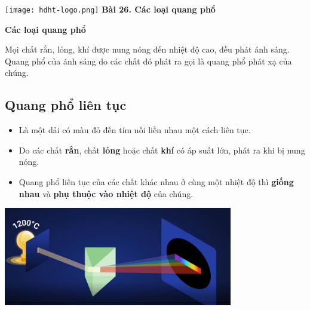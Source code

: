 \newcommand{\chapter}[2][]{
	\newcommand{\chapname}{#2}
	\begin{flushleft}
		\begin{minipage}[t]{\linewidth}
			\texttt{[image: hdht-logo.png]}
			\hspace{0pt}	
			\sffamily\bfseries\large Bài  26. Các loại quang phổ
			\begin{flushleft}
				\huge\bfseries #1
			\end{flushleft}
		\end{minipage}
	\end{flushleft}
	\vspace{1cm}
	\normalfont\normalsize
}
\chapter[Các loại quang phổ]{Các loại quang phổ}

 Mọi chất rắn, lỏng, khí được nung nóng đến nhiệt độ cao, đều phát ánh sáng. Quang phổ của ánh sáng do các chất đó phát ra gọi là quang phổ phát xạ của chúng.

\subsection{Quang phổ liên tục}

	\begin{itemize}

		\item Là một dải có màu đỏ đến tím nối liền nhau một cách liên tục.

 		\item Do các chất \textbf{rắn}, chất \textbf{lỏng} hoặc chất \textbf{khí} có áp suất lớn, phát ra khi bị nung nóng.

 		\item Quang phổ liên tục của các chất khác nhau ở cùng một nhiệt độ thì \textbf{giống nhau} và \textbf{phụ thuộc vào nhiệt độ} của chúng.
 
	\end{itemize}
\begin{center}
	\includegraphics[width=10cm]{../figs/VN12-PH-36-L-021-2-1.JPG}
\end{center}


